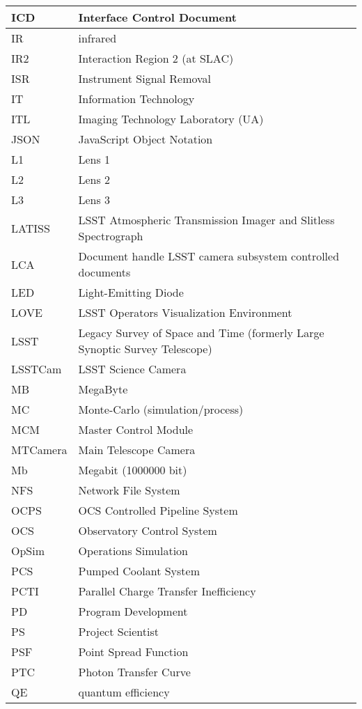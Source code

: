 \begin{longtable}{p{}p{}}
ICD & Interface Control Document \\\hline
IR & infrared \\\hline
IR2 & Interaction Region 2 (at SLAC) \\\hline
ISR & Instrument Signal Removal \\\hline
IT & Information Technology \\\hline
ITL & Imaging Technology Laboratory (UA) \\\hline
JSON & JavaScript Object Notation \\\hline
L1 & Lens 1 \\\hline
L2 & Lens 2 \\\hline
L3 & Lens 3 \\\hline
LATISS & LSST Atmospheric Transmission Imager and Slitless Spectrograph \\\hline
LCA & Document handle LSST camera subsystem controlled documents \\\hline
LED & Light-Emitting Diode \\\hline
LOVE & LSST Operators Visualization Environment \\\hline
LSST & Legacy Survey of Space and Time (formerly Large Synoptic Survey Telescope) \\\hline
LSSTCam & LSST Science Camera \\\hline
MB & MegaByte \\\hline
MC & Monte-Carlo (simulation/process) \\\hline
MCM & Master Control Module \\\hline
MTCamera & Main Telescope Camera \\\hline
Mb & Megabit (1000000 bit) \\\hline
NFS & Network File System \\\hline
OCPS & OCS Controlled Pipeline System \\\hline
OCS & Observatory Control System \\\hline
OpSim & Operations Simulation \\\hline
PCS & Pumped Coolant System \\\hline
PCTI & Parallel Charge Transfer Inefficiency \\\hline
PD & Program Development \\\hline
PS & Project Scientist \\\hline
PSF & Point Spread Function \\\hline
PTC & Photon Transfer Curve \\\hline
QE & quantum efficiency \\\hline

\end{longtable}
